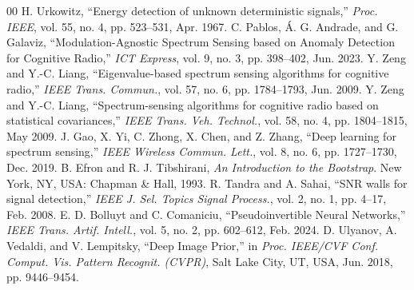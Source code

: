 \documentclass[conference]{IEEEtran}
\begin{document}
\begin{thebibliography}{00}
 H. Urkowitz, ``Energy detection of unknown deterministic
signals,'' \textit{Proc. IEEE}, vol. 55, no. 4, pp. 523--531, Apr. 1967.
 C. Pablos, \'{A}. G. Andrade, and G. Galaviz,
``Modulation-Agnostic Spectrum Sensing based on Anomaly Detection for
Cognitive Radio,'' \textit{ICT Express}, vol. 9, no. 3, pp. 398--402,
Jun. 2023.
 Y. Zeng and Y.-C. Liang, ``Eigenvalue-based spectrum
sensing algorithms for cognitive radio,'' \textit{IEEE Trans. Commun.},
vol. 57, no. 6, pp. 1784--1793, Jun. 2009.
 Y. Zeng and Y.-C. Liang, ``Spectrum-sensing algorithms for
cognitive radio based on statistical covariances,'' \textit{IEEE Trans.
Veh. Technol.}, vol. 58, no. 4, pp. 1804--1815, May 2009.
 J. Gao, X. Yi, C. Zhong, X. Chen, and Z. Zhang, ``Deep
learning for spectrum sensing,'' \textit{IEEE Wireless Commun. Lett.},
vol. 8, no. 6, pp. 1727--1730, Dec. 2019.
 B. Efron and R. J. Tibshirani, \textit{An Introduction to
the Bootstrap}. New York, NY, USA: Chapman \& Hall, 1993.
 R. Tandra and A. Sahai, ``SNR walls for signal detection,''
\textit{IEEE J. Sel. Topics Signal Process.}, vol. 2, no. 1, pp. 4--17,
Feb. 2008.
 E. D. Bolluyt and C. Comaniciu, ``Pseudoinvertible Neural
Networks,'' \textit{IEEE Trans. Artif. Intell.}, vol. 5, no. 2,
pp. 602--612, Feb. 2024.
 D. Ulyanov, A. Vedaldi, and V. Lempitsky, ``Deep Image
Prior,'' in \textit{Proc. IEEE/CVF Conf. Comput. Vis. Pattern Recognit.
(CVPR)}, Salt Lake City, UT, USA, Jun. 2018, pp. 9446--9454.
\end{thebibliography}
\vspace{12pt}
\end{document}
